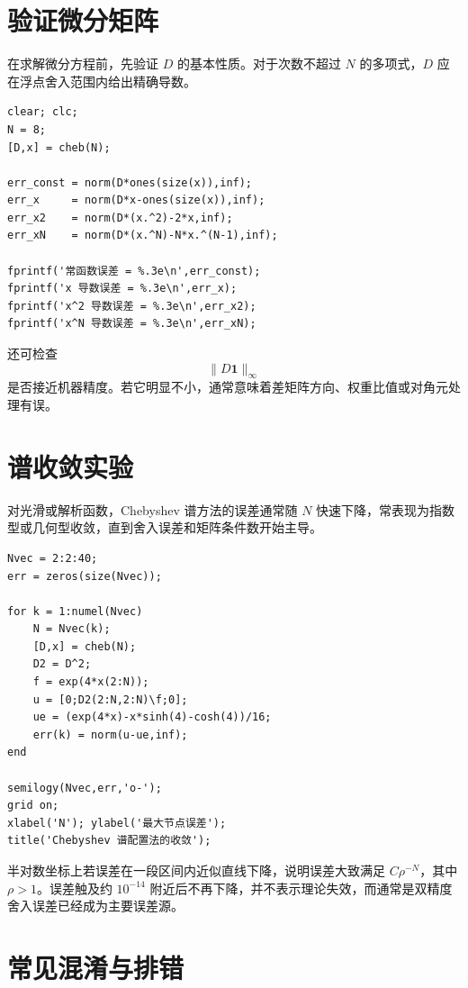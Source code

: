 \documentclass[11pt,a4paper]{ctexart}
\numberwithin{equation}{section}
\newcommand{\vect}[1]{\bm{#1}}
\begin{document}
\section{验证微分矩阵}

在求解微分方程前，先验证 $D$ 的基本性质。对于次数不超过 $N$ 的多项式，$D$ 应在浮点舍入范围内给出精确导数。

\begin{lstlisting}[caption={微分矩阵自检}]
clear; clc;
N = 8;
[D,x] = cheb(N);

err_const = norm(D*ones(size(x)),inf);
err_x     = norm(D*x-ones(size(x)),inf);
err_x2    = norm(D*(x.^2)-2*x,inf);
err_xN    = norm(D*(x.^N)-N*x.^(N-1),inf);

fprintf('常函数误差 = %.3e\n',err_const);
fprintf('x 导数误差 = %.3e\n',err_x);
fprintf('x^2 导数误差 = %.3e\n',err_x2);
fprintf('x^N 导数误差 = %.3e\n',err_xN);
\end{lstlisting}

还可检查
\begin{equation}
  \lVert D\vect{1}\rVert_\infty
\end{equation}
是否接近机器精度。若它明显不小，通常意味着差矩阵方向、权重比值或对角元处理有误。

\section{谱收敛实验}

对光滑或解析函数，Chebyshev 谱方法的误差通常随 $N$ 快速下降，常表现为指数型或几何型收敛，直到舍入误差和矩阵条件数开始主导。

\begin{lstlisting}[caption={误差随 $N$ 的变化}]
Nvec = 2:2:40;
err = zeros(size(Nvec));

for k = 1:numel(Nvec)
    N = Nvec(k);
    [D,x] = cheb(N);
    D2 = D^2;
    f = exp(4*x(2:N));
    u = [0;D2(2:N,2:N)\f;0];
    ue = (exp(4*x)-x*sinh(4)-cosh(4))/16;
    err(k) = norm(u-ue,inf);
end

semilogy(Nvec,err,'o-');
grid on;
xlabel('N'); ylabel('最大节点误差');
title('Chebyshev 谱配置法的收敛');
\end{lstlisting}

半对数坐标上若误差在一段区间内近似直线下降，说明误差大致满足 $C\rho^{-N}$，其中 $\rho>1$。误差触及约 $10^{-14}$ 附近后不再下降，并不表示理论失效，而通常是双精度舍入误差已经成为主要误差源。

\section{常见混淆与排错}
\end{document}

